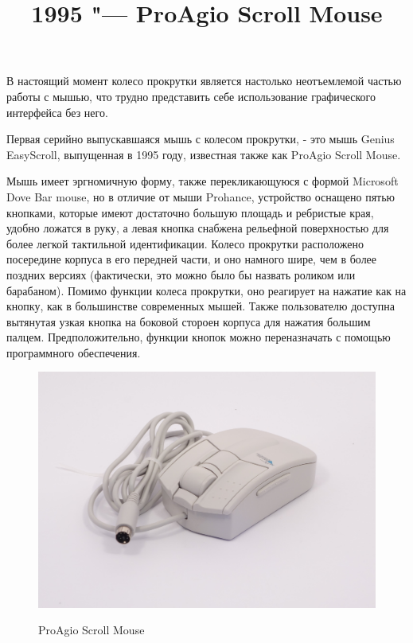 \documentclass[11pt, a4paper]{article}
\begin{document}
\title{1995 "--- ProAgio Scroll Mouse}
\date{}
\maketitle

В настоящий момент колесо прокрутки является настолько неотъемлемой частью работы с мышью, что трудно представить себе использование графического интерфейса без него.

    Первая серийно выпускавшаяся мышь с колесом прокрутки, - это мышь Genius EasyScroll, выпущенная в 1995 году, известная также как ProAgio Scroll Mouse.
    
    Мышь имеет эргномичную форму, также перекликающуюся с формой Microsoft Dove Bar mouse, но в отличие от мыши Prohance, устройство оснащено пятью кнопками, которые имеют достаточно большую площадь и ребристые края, удобно ложатся в руку, а левая кнопка снабжена рельефной поверхностью для более легкой тактильной идентификации. Колесо прокрутки расположено посередине корпуса в его передней части, и оно намного шире, чем в более поздних версиях (фактически, это можно было бы назвать роликом или барабаном). Помимо функции колеса прокрутки, оно реагирует на нажатие как на кнопку, как в большинстве современных мышей. Также пользователю доступна вытянутая узкая кнопка на боковой стороен корпуса для нажатия большим палцем. Предположительно, функции кнопок можно переназначать с помощью программного обеспечения.

\begin{figure}[h]
        \centering
    \includegraphics[scale=0.5]{1995_pro_agio_scroll_mouse/4.1.jpg}
        \label{quad-bottom}
        \caption{ProAgio Scroll Mouse}
    \end{figure}
\end{document}
